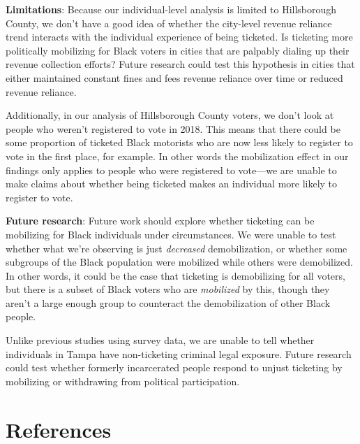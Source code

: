 \documentclass[
  12pt,
]{article}
\begin{document}
\textbf{Limitations}: Because our individual-level analysis is limited to Hillsborough County, we don't have a good idea of whether the city-level revenue reliance trend interacts with the individual experience of being ticketed. Is ticketing more politically mobilizing for Black voters in cities that are palpably dialing up their revenue collection efforts? Future research could test this hypothesis in cities that either maintained constant fines and fees revenue reliance over time or reduced revenue reliance.

Additionally, in our analysis of Hillsborough County voters, we don't look at people who weren't registered to vote in 2018. This means that there could be some proportion of ticketed Black motorists who are now less likely to register to vote in the first place, for example. In other words the mobilization effect in our findings only applies to people who were registered to vote---we are unable to make claims about whether being ticketed makes an individual more likely to register to vote.

\textbf{Future research}: Future work should explore whether ticketing can be mobilizing for Black individuals under circumstances. We were unable to test whether what we're observing is just \emph{decreased} demobilization, or whether some subgroups of the Black population were mobilized while others were demobilized. In other words, it could be the case that ticketing is demobilizing for all voters, but there is a subset of Black voters who are \emph{mobilized} by this, though they aren't a large enough group to counteract the demobilization of other Black people.

Unlike previous studies using survey data, we are unable to tell whether individuals in Tampa have non-ticketing criminal legal exposure. Future research could test whether formerly incarcerated people respond to unjust ticketing by mobilizing or withdrawing from political participation.

\newpage

\hypertarget{references}{%
\section*{References}\label{references}}
\end{document}
